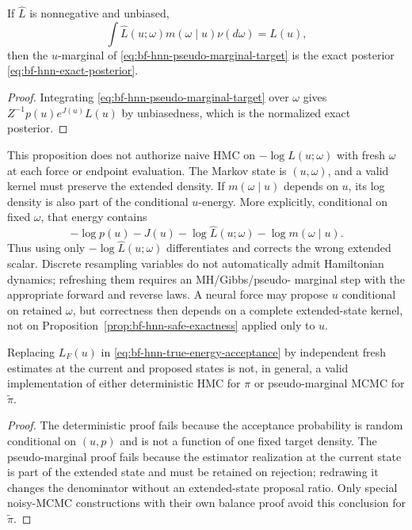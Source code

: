 \begin{proposition}
\label{prop:bf-hnn-pseudo-marginal}
If $\widehat L$ is nonnegative and unbiased,
\begin{equation}
 \int\widehat L(u;\omega)m(\omega\mid u)\nu(d\omega)=L(u),
 \end{equation}
then the $u$-marginal of
\eqref{eq:bf-hnn-pseudo-marginal-target} is the exact posterior
\eqref{eq:bf-hnn-exact-posterior}.
\end{proposition}

\begin{proof}
Integrating \eqref{eq:bf-hnn-pseudo-marginal-target} over $\omega$ gives
$Z^{-1}p(u)e^{J(u)}L(u)$ by unbiasedness, which is the normalized exact
posterior.
\end{proof}

This proposition does not authorize naive HMC on
$-\log\widehat L(u;\omega)$ with fresh $\omega$ at each force or endpoint
evaluation.  The Markov state is $(u,\omega)$, and a valid kernel must preserve
the extended density.  If $m(\omega\mid u)$ depends on $u$, its log density is
also part of the conditional $u$-energy.  More explicitly, conditional on
fixed $\omega$, that energy contains
\begin{equation}
 -\log p(u)-J(u)-\log\widehat L(u;\omega)-\log m(\omega\mid u).
\end{equation}
Thus using only
$-\log\widehat L(u;\omega)$ differentiates and corrects the wrong extended
scalar.  Discrete resampling variables do not automatically
admit Hamiltonian dynamics; refreshing them requires an MH/Gibbs/pseudo-
marginal step with the appropriate forward and reverse laws.  A neural force
may propose $u$ conditional on retained $\omega$, but correctness then depends
on a complete extended-state kernel, not on
Proposition~\ref{prop:bf-hnn-safe-exactness} applied only to $u$.

\begin{proposition}
\label{prop:bf-hnn-fresh-noise-invalid}
Replacing $L_F(u)$ in
\eqref{eq:bf-hnn-true-energy-acceptance} by independent fresh estimates at the
current and proposed states is not, in general, a valid implementation of
either deterministic HMC for $\pi$ or pseudo-marginal MCMC for
$\widetilde\pi$.
\end{proposition}

\begin{proof}
The deterministic proof fails because the acceptance probability is random
conditional on $(u,p)$ and is not a function of one fixed target density.
The pseudo-marginal proof fails because the estimator realization at the
current state is part of the extended state and must be retained on rejection;
redrawing it changes the denominator without an extended-state proposal ratio.
Only special noisy-MCMC constructions with their own balance proof avoid this
conclusion for $\widetilde\pi$.
\end{proof}


